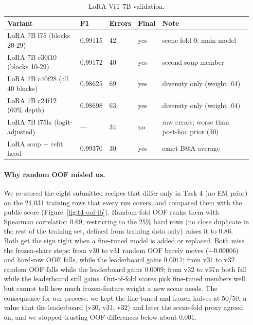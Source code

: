 \documentclass[../main.tex]{subfiles}
\begin{document}
\begin{table}[H]\centering\small
\begin{tabular}{@{}L{.32\linewidth}L{.10\linewidth}L{.08\linewidth}L{.08\linewidth}L{.30\linewidth}@{}}
\toprule
\textbf{Variant} & \textbf{F1} & \textbf{Errors} & \textbf{Final} & \textbf{Note} \\
\midrule
LoRA 7B l75 (blocks 20-29) & 0.99115 & 42 & yes & scene fold 0; main model \\
LoRA 7B c30f10 (blocks 10-29) & 0.99172 & 40 & yes & second soup member \\
LoRA 7B c40f28 (all 40 blocks) & 0.98625 & 69 & yes & diversity only (weight .04) \\
LoRA 7B c24f12 (60\% depth) & 0.98698 & 63 & yes & diversity only (weight .04) \\
LoRA 7B l75la (logit-adjusted) & --- & 34 & no & raw errors; worse than post-hoc prior (30) \\
LoRA soup + refit head & 0.99370 & 30 & yes & exact B@A average \\
\bottomrule
\end{tabular}
\caption{LoRA ViT-7B validation.}\label{tab:t4-backbones-lora}
\end{table}

\paragraph{Why random OOF misled us.} We re-scored the eight submitted recipes that differ only in Task 4 (no EM prior) on the 21,031 training rows that every run covers, and compared them with the public score (Figure~\ref{fig:t4-oof-lb}). Random-fold OOF ranks them with Spearman correlation 0.69; restricting to the 25\% hard rows (no close duplicate in the rest of the training set, defined from training data only) raises it to 0.86. Both get the sign right when a fine-tuned model is added or replaced. Both miss the frozen-share steps: from v30 to v31 random OOF barely moves ($+0.00006$) and hard-row OOF falls, while the leaderboard gains $0.0017$; from v31 to v32 random OOF falls while the leaderboard gains $0.0009$; from v32 to v37n both fall while the leaderboard still gains. Out-of-fold scores pick fine-tuned members well but cannot tell how much frozen-feature weight a new scene needs. The consequence for our process: we kept the fine-tuned and frozen halves at 50/50, a value that the leaderboard (v30, v31, v32) and later the scene-fold proxy agreed on, and we stopped trusting OOF differences below about 0.001.
\end{document}
